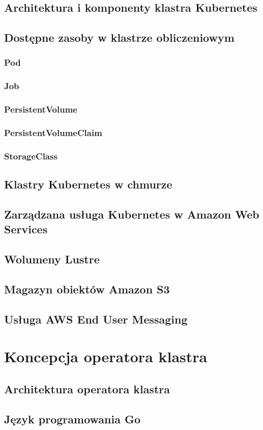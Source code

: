 \subsection{Architektura i komponenty klastra Kubernetes}

\subsection{Dostępne zasoby w klastrze obliczeniowym}

\subsubsection{Pod}

\subsubsection{Job}

\subsubsection{PersistentVolume}

\subsubsection{PersistentVolumeClaim}

\subsubsection{StorageClass}

\subsection{Klastry Kubernetes w chmurze}

\subsection{Zarządzana usługa Kubernetes w Amazon Web Services}

\subsection{Wolumeny Lustre}

\subsection{Magazyn obiektów Amazon S3}

\subsection{Usługa AWS End User Messaging}


\section{Koncepcja operatora klastra}

\subsection{Architektura operatora klastra}

\subsection{Język programowania Go}
